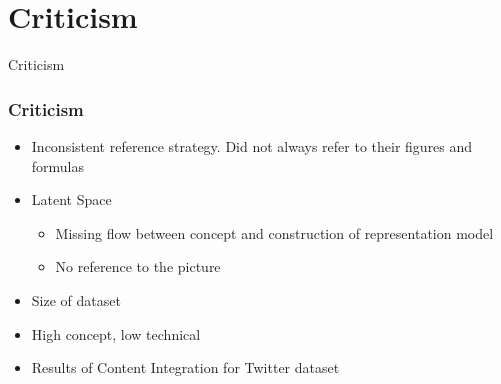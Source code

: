 \section{Criticism}

\begin{frame}
        \centering
        \huge Criticism
\end{frame}

\begin{frame}
	\frametitle{Criticism}
	\begin{itemize}
		\item Inconsistent reference strategy. Did not always refer to their figures and formulas
		\item Latent Space
		\begin{itemize}
			\item Missing flow between concept and construction of representation model
			\item No reference to the picture
		\end{itemize}
		\item Size of dataset
		\item High concept, low technical
		\item Results of Content Integration for Twitter dataset
	\end{itemize}
\end{frame}